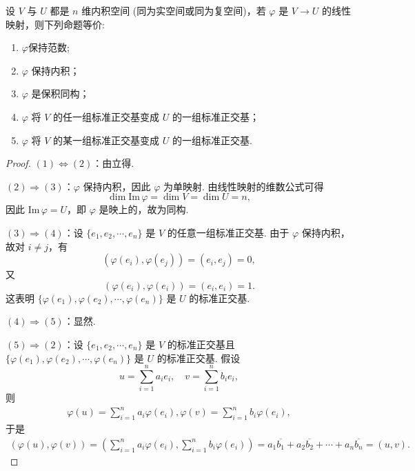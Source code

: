 \documentclass[../../main.tex]{subfiles}%
\begin{document}
\begin{theorem}\label{theorem:保积同构的等价命题}
设 $V$ 与 $U$ 都是 $n$ 维内积空间 (同为实空间或同为复空间)，若 $\varphi$ 是 $V \to U$ 的线性映射，则下列命题等价:
\begin{enumerate}[(1)]
\item $\varphi$保持范数;

\item $\varphi$ 保持内积；

\item  $\varphi$ 是保积同构；

\item  $\varphi$ 将 $V$ 的任一组标准正交基变成 $U$ 的一组标准正交基；

\item $\varphi$ 将 $V$ 的某一组标准正交基变成 $U$ 的一组标准正交基.
\end{enumerate}
\end{theorem}
\begin{proof}

$(1) \Leftrightarrow  (2)$：由立得.

$(2) \Rightarrow (3)$：$\varphi$ 保持内积，因此 $\varphi$ 为单映射. 由线性映射的维数公式可得
\[
\dim \text{Im}\,\varphi = \dim V = \dim U = n,
\]
因此 $\text{Im}\,\varphi = U$，即 $\varphi$ 是映上的，故为同构.

$(3) \Rightarrow (4)$：设 $\{e_1,e_2,\cdots,e_n\}$ 是 $V$ 的任意一组标准正交基. 由于 $\varphi$ 保持内积，故对 $i \neq j$，有
\[
(\varphi(e_i),\varphi(e_j)) = (e_i,e_j) = 0,
\]
又
\[
(\varphi(e_i),\varphi(e_i)) = (e_i,e_i) = 1.
\]
这表明 $\{\varphi(e_1),\varphi(e_2),\cdots,\varphi(e_n)\}$ 是 $U$ 的标准正交基.

$(4) \Rightarrow (5)$：显然.

$(5) \Rightarrow (2)$：设 $\{e_1,e_2,\cdots,e_n\}$ 是 $V$ 的标准正交基且 $\{\varphi(e_1),\varphi(e_2),\cdots,\varphi(e_n)\}$ 是 $U$ 的标准正交基. 假设
\[
u = \sum_{i = 1}^{n}a_ie_i,\quad v = \sum_{i = 1}^{n}b_ie_i,
\]
则
\begin{align*}
\varphi (u)=\sum_{i=1}^n{a_i\varphi (e_i),\varphi (v)=\sum_{i=1}^n{b_i\varphi (e_i),}}
\end{align*}
于是
\begin{align*}
(\varphi (u),\varphi (v))=\left( \sum_{i=1}^n{a_i\varphi (e_i),\sum_{i=1}^n{b_i\varphi (e_i)}} \right) =a_1\overline{b_1}+a_2\overline{b_2}+\cdots +a_n\overline{b_n}=(u,v).
\end{align*}
\end{proof}
\end{document}
